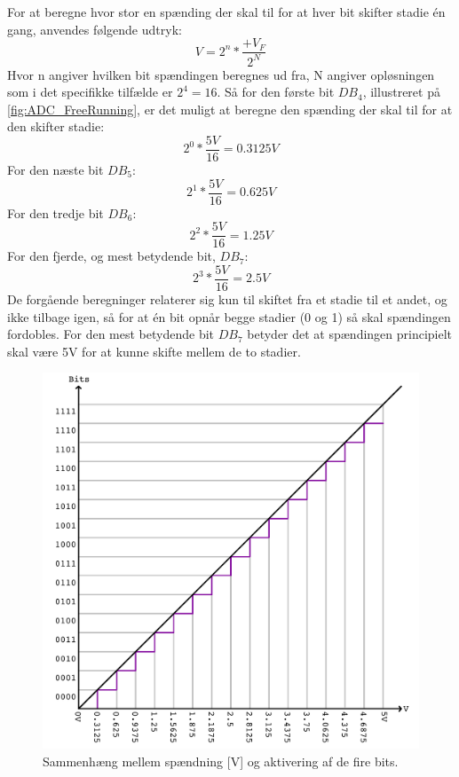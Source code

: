 For at beregne hvor stor en spænding der skal til for at hver bit skifter stadie én gang, anvendes følgende udtryk:
%
\begin{equation}
	V = 2^n*\frac{+V_F}{2^N}
\end{equation}
% 
Hvor n angiver hvilken bit spændingen beregnes ud fra, N angiver opløsningen som i det specifikke tilfælde er $2^4 = 16$. Så for den første bit $DB_4$, illustreret på \autoref{fig:ADC_FreeRunning}, er det muligt at beregne den spænding der skal til for at den skifter stadie:
%
\begin{equation}
	2^0*\frac{5V}{16} = 0.3125V
\end{equation}
% 
For den næste bit $DB_5$:
%
\begin{equation}
	2^1*\frac{5V}{16} = 0.625V
\end{equation}
%
For den tredje bit $DB_6$:
%
\begin{equation}
	2^2*\frac{5V}{16} = 1.25V
\end{equation}
%
For den fjerde, og mest betydende bit, $DB_7$:
%
\begin{equation}
	2^3*\frac{5V}{16} = 2.5V
\end{equation}
%
De forgående beregninger relaterer sig kun til skiftet fra et stadie til et andet, og ikke tilbage igen, så for at én bit opnår begge stadier (0 og 1) så skal spændingen fordobles. For den mest betydende bit $DB_7$ betyder det at spændingen principielt skal være 5V for at kunne skifte mellem de to stadier. 
%
\begin{figure}[H]
	\centering
	\includegraphics[resolution=300,scale=\circuitSize]{Figure/Circuits/Bits.pdf}
	\caption{Sammenhæng mellem spændning [V] og aktivering af de fire bits.}
	\label{fig:ADC_Bits}
\end{figure}
